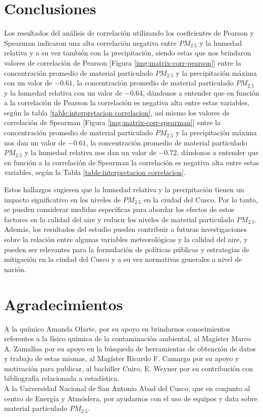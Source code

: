\documentclass[a4paper,11pt]{article}
\begin{document}




\section{Conclusiones}
 Los resultados del análisis de correlación utilizando los coeficientes de Pearson y Spearman indicaron una alta correlación negativa entre $PM_{2.5}$ y la humedad relativa y a su vez también con la precipitación, siendo estas que nos brindaron valores de correlación de Pearson [Figura \ref{img:matrix-corr-pearson}] entre la concentración promedio de material particulado $PM_{2.5}$ y la precipitación máxima con un valor de $-0.61$, la concentración promedio de material particulado $PM_{2.5}$ y la humedad relativa con un valor de $-0.64$, dándonos a entender que en función a la correlación de Pearson la correlación es negativa alta entre estas variables, según la tabla \ref{table:interpretacion correlacion}, así mismo los valores de correlación de Spearman [Figura \ref{img:matrix-corr-spearman}] entre la concentración promedio de material particulado $PM_{2.5}$ y la precipitación máxima nos dan un valor de $-0.61$, la concentración promedio de material particulado $PM_{2.5}$ y la humedad relativa nos dan un valor de $-0.72$, dándonos a entender que en función a la correlación de Spearman la correlación es negativa alta entre estas variables, según la Tabla \ref{table:interpretacion correlacion}.

Estos hallazgos sugieren que la humedad relativa y la precipitación tienen un impacto significativo en los niveles de $PM_{2.5}$ en la ciudad del Cusco. Por lo tanto, se pueden considerar medidas específicas para abordar los efectos de estos factores en la calidad del aire y reducir los niveles de material particulado $PM_{2.5}$. Además, los resultados del estudio pueden contribuir a futuras investigaciones sobre la relación entre algunas variables meteorológicas y la calidad del aire, y pueden ser relevantes para la formulación de políticas públicas y estrategias de mitigación en la ciudad del Cusco y a su vez normativas generales a nivel de nación.


\section*{Agradecimientos}
A la químico Amanda Olarte, por su apoyo en brindarnos conocimientos referentes a la físico quimica de la contaminación ambiental, al Magíster Marco A. Zamalloa por su apoyo en la búsqueda de herramientas de obtención de datos y trabajo de estas mismas, al Magíster Ricardo F. Camargo por su apoyo y motivación para publicar, al bachiller Cuiro, E. Weyner por su contribución con bibliografía relacionada a estadística.   \\
A la Universidad Nacional de San Antonio Abad del Cusco, que en conjunto al centro de Energía y Atmósfera, por ayudarnos con el uso de equipos y data sobre material particulado $PM_{2.5}$.

\printbibliography
%
\end{document}
